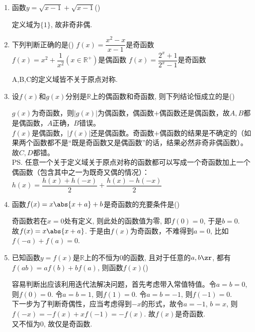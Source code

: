 \begin{enumerate}
\item 函数$y=\sqrt{x-1}+\sqrt{x-1}$\dotfill()
\begin{jieda}
定义域为$\{1\}$, 故非奇非偶. 
\end{jieda}


\item 下列判断正确的是\dotfill()
{$f(x)=\dfrac{x^2-x}{x-1}$是奇函数}
{$f(x)=x^2+\dfrac{1}{x^2}(x\in\mathbb{R}^+)是偶函数$}
{$f(x)=\dfrac{2^x+1}{2^x-1}$是奇函数}
\begin{jieda}
A,B,C的定义域皆不关于原点对称. 
\end{jieda}


\item 设$f(x)$和$g(x)$分别是$\mathbb{R}$上的偶函数和奇函数, 则下列结论恒成立的是\dotfill()
\begin{jieda}
$g(x)$为奇函数，则$|g(x)|$为偶函数，偶函数$+$偶函数还是偶函数，故$A, B$都是偶函数，$A$正确，$B$错误。\\
$f(x)$是偶函数，$|f(x)|$还是偶函数。奇函数$+$偶函数的结果是不确定的（如果两个函数都不是“既是奇函数又是偶函数”的话，结果必然非奇非偶函数）。故$C,D$都错。\\
\ps 任意一个关于定义域关于原点对称的函数都可以写成一个奇函数加上一个偶函数（包含其中之一为既奇又偶的情况）：$h(x) = \dfrac{h(x)+h(-x)}{2} + \dfrac{h(x) - h(-x)}{2}$
\end{jieda}


\item 函数$f(x)=x\abs{x+a}+b$是奇函数的充要条件是\dotfill()
\begin{jieda}
奇函数若在$x=0$处有定义, 则此处的函数值为零, 即$f(0)=0$, 于是$b=0$. \\
故$f(x)=x\abs{x+a}$. 于是由$f(x)$为奇函数，不难得到$a=0$, 比如$f(-a)+f(a)=0$. 
\end{jieda}


\item 已知函数$y=f(x)$是$\mathbb{R}$上的不恒为0的函数, 且对于任意的$a,b\zr$, 都有$f(ab)=af(b)+bf(a)$, 则函数$f(x)$\dotfill()
\begin{jieda}
容易判断出应该利用迭代法解决问题，首先考虑带入常值特值。令$a=b=0$, 则$f(0)=0$. 令$a=b=1$, 则$f(1)=0$. 令$a=b=-1$, 则$f(-1)=0$. \\
下一步为了判断奇偶性，应当考虑得到$-x$的形式，故令$a=-1$, $b=x$, 则$f(-x)=-f(x)+xf(-1)=-f(x)$. 故$f(x)$是奇函数. \\
又不恒为0, 故仅是奇函数. 
\end{jieda}



\end{enumerate}
